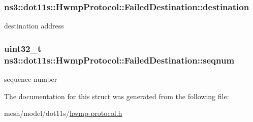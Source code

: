 \subsubsection[{\texorpdfstring{destination}{destination}}]{ ns3\+::dot11s\+::\+Hwmp\+Protocol\+::\+Failed\+Destination\+::destination}\hypertarget{structns3_1_1dot11s_1_1HwmpProtocol_1_1FailedDestination_a066b5f8457c2cac97e71978481a7fb35}{}\label{structns3_1_1dot11s_1_1HwmpProtocol_1_1FailedDestination_a066b5f8457c2cac97e71978481a7fb35}


destination address 

\subsubsection[{\texorpdfstring{seqnum}{seqnum}}]{\setlength{\rightskip}{0pt plus 5cm}uint32\+\_\+t ns3\+::dot11s\+::\+Hwmp\+Protocol\+::\+Failed\+Destination\+::seqnum}\hypertarget{structns3_1_1dot11s_1_1HwmpProtocol_1_1FailedDestination_adb7f9239135dd0d74cc71ac34fc13311}{}\label{structns3_1_1dot11s_1_1HwmpProtocol_1_1FailedDestination_adb7f9239135dd0d74cc71ac34fc13311}


sequence number 



The documentation for this struct was generated from the following file\+:\begin{DoxyCompactItemize}
\item 
mesh/model/dot11s/\hyperlink{hwmp-protocol_8h}{hwmp-\/protocol.\+h}\end{DoxyCompactItemize}
